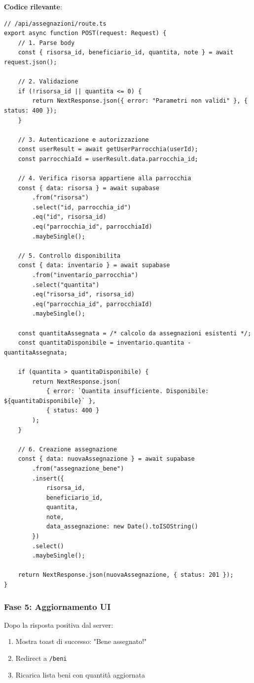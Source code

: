 \documentclass{article}
\begin{document}
\textbf{Codice rilevante}:
\begin{lstlisting}
// /api/assegnazioni/route.ts
export async function POST(request: Request) {
    // 1. Parse body
    const { risorsa_id, beneficiario_id, quantita, note } = await request.json();
    
    // 2. Validazione
    if (!risorsa_id || quantita <= 0) {
        return NextResponse.json({ error: "Parametri non validi" }, { status: 400 });
    }
    
    // 3. Autenticazione e autorizzazione
    const userResult = await getUserParrocchia(userId);
    const parrocchiaId = userResult.data.parrocchia_id;
    
    // 4. Verifica risorsa appartiene alla parrocchia
    const { data: risorsa } = await supabase
        .from("risorsa")
        .select("id, parrocchia_id")
        .eq("id", risorsa_id)
        .eq("parrocchia_id", parrocchiaId)
        .maybeSingle();
    
    // 5. Controllo disponibilita
    const { data: inventario } = await supabase
        .from("inventario_parrocchia")
        .select("quantita")
        .eq("risorsa_id", risorsa_id)
        .eq("parrocchia_id", parrocchiaId)
        .maybeSingle();
    
    const quantitaAssegnata = /* calcolo da assegnazioni esistenti */;
    const quantitaDisponibile = inventario.quantita - quantitaAssegnata;
    
    if (quantita > quantitaDisponibile) {
        return NextResponse.json(
            { error: `Quantita insufficiente. Disponibile: ${quantitaDisponibile}` },
            { status: 400 }
        );
    }
    
    // 6. Creazione assegnazione
    const { data: nuovaAssegnazione } = await supabase
        .from("assegnazione_bene")
        .insert({
            risorsa_id,
            beneficiario_id,
            quantita,
            note,
            data_assegnazione: new Date().toISOString()
        })
        .select()
        .maybeSingle();
    
    return NextResponse.json(nuovaAssegnazione, { status: 201 });
}
\end{lstlisting}

\subsubsection{Fase 5: Aggiornamento UI}

Dopo la risposta positiva dal server:
\begin{enumerate}[leftmargin=*]
\item Mostra toast di successo: "Bene assegnato!"
\item Redirect a \texttt{/beni}
\item Ricarica lista beni con quantità aggiornata
\end{enumerate}
\end{document}
